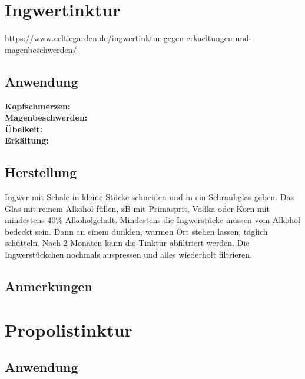 \section{Ingwertinktur}

\url{https://www.celticgarden.de/ingwertinktur-gegen-erkaeltungen-und-magenbeschwerden/}

   

\subsection{Anwendung}

\textbf{Kopfschmerzen:} \\ 

\textbf{Magenbeschwerden:} \\ 

\textbf{Übelkeit:} \\ 

\textbf{Erkältung:} \\ 


\subsection{Herstellung}

Ingwer mit Schale in kleine Stücke schneiden und in ein Schraubglas geben. Das Glas mit reinem Alkohol füllen, zB mit Primasprit, Vodka oder Korn mit mindestens 40\% Alkoholgehalt. Mindestens die Ingwerstücke müssen vom Alkohol bedeckt sein. Dann an einem dunklen, warmen Ort stehen lassen, täglich schütteln. Nach 2 Monaten kann die Tinktur abfiltriert werden. Die Ingwerstückchen nochmals auspressen und alles wiederholt filtrieren.

\subsection{Anmerkungen}




\section{Propolistinktur}

  

\subsection{Anwendung}

